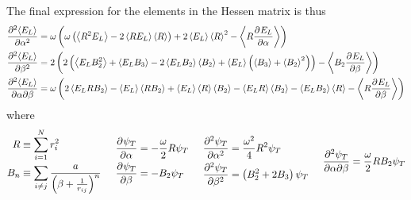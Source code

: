 \documentclass[a4paper, hidelinks, 10pt]{article}\usepackage[utf8]{inputenc}
\newcommand{\prtl}{\mathrm{\partial}} %
\newcommand{\ecp}[1]{\left< {#1} \right>} %
\newcommand{\suml}[2]{\sum\limits_{#1=1}^{#2}}
\begin{document}
    The final expression for the elements in the Hessen matrix is thus
        \begin{equation}
            \begin{aligned}
                \prd{\alpha}[\ecp{E_L}][2] &=
                \omega\left(\omega\left(\ecp{R^2E_L} -
                2\ecp{RE_L}\ecp{R}\right) + 2\ecp{E_L}\ecp{R}^2 -
                \ecp{R\prd{\alpha}[E_L]}\right) \\
                \prd{\beta}[\ecp{E_L}][2] &= 2\left(2\left(\ecp{E_LB_2^2} +
                \ecp{E_LB_3} - 2\ecp{E_LB_2}\ecp{B_2} +
                \ecp{E_L}\left(\ecp{B_3} + \ecp{B_2}^2\right)\right) -
                \ecp{B_2\prd{\beta}[E_L]}\right) \\
                \mixprd{\ecp{E_L}}[\alpha][\beta] &= \omega\left(2\ecp{E_LRB_2}
                - \ecp{E_L}\ecp{RB_2} + \ecp{E_L}\ecp{R}\ecp{B_2} -
                \ecp{E_LR}\ecp{B_2} - \ecp{E_LB_2}\ecp{R} -
                \ecp{R\prd{\beta}[E_L]}\right)
            \end{aligned}
            \label{eq:HessenElemFin}
        \end{equation}
    where 
        \begin{equation}
            \begin{aligned}
                R &\equiv \suml{i}{N}r^2_i \\ 
                B_n &\equiv \sum\limits_{i\neq j} \frac{a}{\left(\beta +
                \frac{1}{r_{ij}}\right)^n} 
            \end{aligned}
            \hspace{0.5cm}
            \begin{aligned}
                \prd{\alpha}[\psi_T] &= -\frac{\omega}{2}R\psi_T  \\
                \prd{\beta}[\psi_T] &= -B_2\psi_T 
            \end{aligned}
            \hspace{0.5cm}
            \begin{aligned}
                \prd{\alpha}[\psi_T][2] &= \frac{\omega^2}{4}R^2\psi_T \\
                \prd{\beta}[\psi_T][2] &= \left(B^2_2 + 2B_3\right)\psi_T
            \end{aligned}
            \hspace{0.5cm}
            \begin{aligned}
                \frac{\prtl^2\psi_T}{\prtl\alpha\prtl\beta} =
                \frac{\omega}{2}RB_2\psi_T
            \end{aligned}
            \label{eq:RBdef}
        \end{equation}
\end{document}
